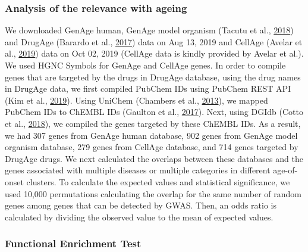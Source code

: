 \documentclass[12pt,twoside]{unicam}
\begin{document}
\hypertarget{analysis-of-the-relevance-with-ageing}{%
\subsubsection{Analysis of the relevance with ageing}\label{analysis-of-the-relevance-with-ageing}}

We downloaded GenAge human, GenAge model organism (Tacutu et al., \protect\hyperlink{ref-Tacutu2018}{2018}) and DrugAge (Barardo et al., \protect\hyperlink{ref-Barardo2017}{2017}) data on Aug 13, 2019 and CellAge (Avelar et al., \protect\hyperlink{ref-Avelar2019}{2019}) data on Oct 02, 2019 (CellAge data is kindly provided by Avelar et al.). We used HGNC Symbols for GenAge and CellAge genes. In order to compile genes that are targeted by the drugs in DrugAge database, using the drug names in DrugAge data, we first compiled PubChem IDs using PubChem REST API (Kim et al., \protect\hyperlink{ref-Kim2019}{2019}). Using UniChem (Chambers et al., \protect\hyperlink{ref-Chambers2013}{2013}), we mapped PubChem IDs to ChEMBL IDs (Gaulton et al., \protect\hyperlink{ref-Gaulton2017}{2017}). Next, using DGIdb (Cotto et al., \protect\hyperlink{ref-Cotto2018}{2018}), we compiled the genes targeted by these ChEMBL IDs. As a result, we had 307 genes from GenAge human database, 902 genes from GenAge model organism database, 279 genes from CellAge database, and 714 genes targeted by DrugAge drugs. We next calculated the overlaps between these databases and the genes associated with multiple diseases or multiple categories in different age-of-onset clusters. To calculate the expected values and statistical significance, we used 10,000 permutations calculating the overlap for the same number of random genes among genes that can be detected by GWAS. Then, an odds ratio is calculated by dividing the observed value to the mean of expected values.

\hypertarget{disGO}{%
\subsubsection{Functional Enrichment Test}\label{disGO}}
\end{document}
